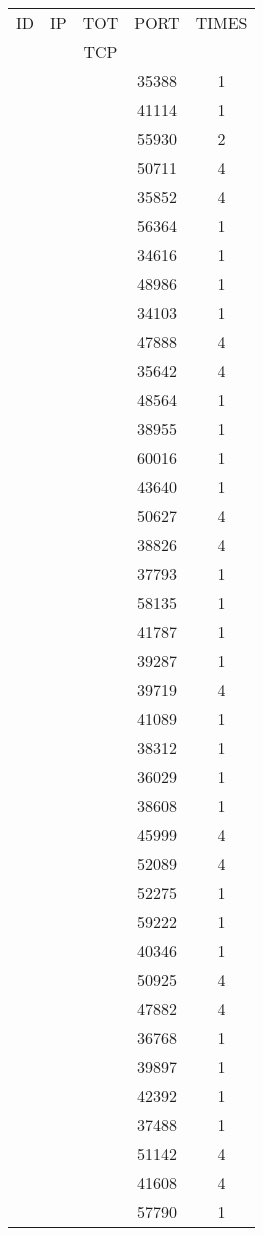 \documentclass[a4paper]{scrartcl}
\begin{document}
\begin{minipage}[b]{0.5\linewidth}
\begin{tabular}{| c | c | c | c | c |}
\hline
ID & IP & TOT & PORT & TIMES \\ 
   &    & TCP &      &       \\ 
\hline
& & & 35388 & 1 \\ & & & 41114 & 1 \\ & & & 55930 & 2 \\ & & & 50711 & 4 \\ & & & 35852 & 4 \\ & & & 56364 & 1 \\ & & & 34616 & 1 \\ & & & 48986 & 1 \\ & & & 34103 & 1 \\ & & & 47888 & 4 \\ & & & 35642 & 4 \\ & & & 48564 & 1 \\ & & & 38955 & 1 \\ & & & 60016 & 1 \\ & & & 43640 & 1 \\ & & & 50627 & 4 \\ & & & 38826 & 4 \\ & & & 37793 & 1 \\ & & & 58135 & 1 \\ & & & 41787 & 1 \\ & & & 39287 & 1 \\ & & & 39719 & 4 \\ & & & 41089 & 1 \\ & & & 38312 & 1 \\ & & & 36029 & 1 \\ & & & 38608 & 1 \\ & & & 45999 & 4 \\ & & & 52089 & 4 \\ & & & 52275 & 1 \\ & & & 59222 & 1 \\ & & & 40346 & 1 \\ & & & 50925 & 4 \\ & & & 47882 & 4 \\ & & & 36768 & 1 \\ & & & 39897 & 1 \\ & & & 42392 & 1 \\ & & & 37488 & 1 \\ & & & 51142 & 4 \\ & & & 41608 & 4 \\ & & & 57790 & 1 \\ \hline\end{tabular}\end{minipage} \hfill\begin{minipage}[b]{0.5\linewidth}\begin{tabular}{| c | c | c | c | c |}

\end{tabular}
\end{minipage}
\end{document}
